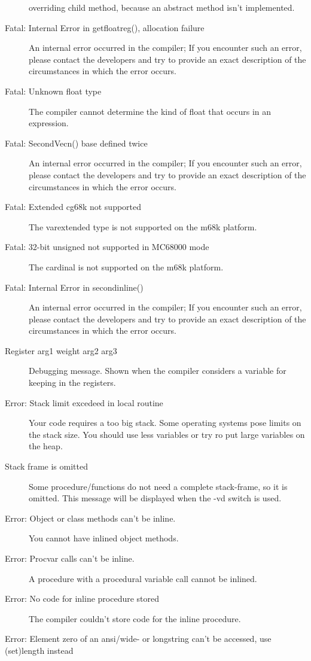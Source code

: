 \begin{description}
 overriding child method, because an abstract method isn't implemented.
\item [Fatal: Internal Error in getfloatreg(), allocation failure]
 An internal error occurred in the compiler; If you encounter such an error,
 please contact the developers and try to provide  an exact description of
 the circumstances in which the error occurs.
\item [Fatal: Unknown float type]
 The compiler cannot determine the kind of float that occurs in an expression.
\item [Fatal: SecondVecn() base defined twice]
 An internal error occurred in the compiler; If you encounter such an error,
 please contact the developers and try to provide  an exact description of
 the circumstances in which the error occurs.
\item [Fatal: Extended cg68k not supported]
 The var{extended} type is not supported on the m68k platform.
\item [Fatal: 32-bit unsigned not supported in MC68000 mode]
 The cardinal is not supported on the m68k platform.
\item [Fatal: Internal Error in secondinline()]
 An internal error occurred in the compiler; If you encounter such an error,
 please contact the developers and try to provide  an exact description of
 the circumstances in which the error occurs.
\item [Register arg1 weight arg2 arg3]
 Debugging message. Shown when the compiler considers a variable for
 keeping in the registers.
\item [Error: Stack limit excedeed in local routine]
 Your code requires a too big stack. Some operating systems pose limits
 on the stack size. You should use less variables or try ro put large
 variables on the heap.
\item [Stack frame is omitted]
 Some procedure/functions do not need a complete stack-frame, so it is omitted.
 This message will be displayed when the {-vd} switch is used.
\item [Error: Object or class methods can't be inline.]
 You cannot have inlined object methods.
\item [Error: Procvar calls can't be inline.]
 A procedure with a procedural variable call cannot be inlined.
\item [Error: No code for inline procedure stored]
 The compiler couldn't store code for the inline procedure.
\item [Error: Element zero of an ansi/wide- or longstring can't be accessed, use (set)length instead]

\end{description}
